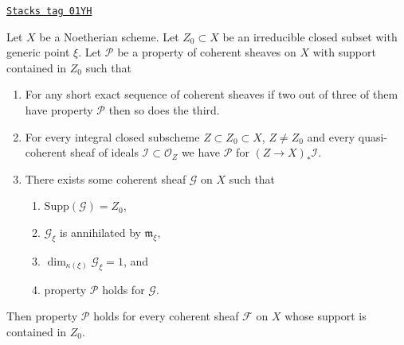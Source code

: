 \begin{lemma}
\label{coherent-lemma-property-irreducible}
\href{https://stacks.math.columbia.edu/tag/01YH}{\texttt{Stacks tag 01YH}}

Let $X$ be a Noetherian scheme. Let $Z_0 \subset X$ be an irreducible closed
subset with generic point $\xi$. Let $\mathcal{P}$ be a property of coherent
sheaves on $X$ with support contained in $Z_0$ such that
\begin{enumerate}
\item For any short exact sequence of coherent sheaves if two
out of three of them have property $\mathcal{P}$ then so does the
third.
\item For every integral closed subscheme $Z \subset Z_0 \subset X$,
$Z \not = Z_0$ and every quasi-coherent sheaf of ideals
$\mathcal{I} \subset \mathcal{O}_Z$ we have
$\mathcal{P}$ for $(Z \to X)_*\mathcal{I}$.
\item There exists some coherent sheaf $\mathcal{G}$ on $X$ such that
\begin{enumerate}
\item $\text{Supp}(\mathcal{G}) = Z_0$,
\item $\mathcal{G}_\xi$ is annihilated by $\mathfrak m_\xi$,
\item $\dim_{\kappa(\xi)} \mathcal{G}_\xi = 1$, and
\item property $\mathcal{P}$ holds for $\mathcal{G}$.
\end{enumerate}
\end{enumerate}
Then property $\mathcal{P}$ holds for every coherent sheaf
$\mathcal{F}$ on $X$ whose support is contained in $Z_0$.
\end{lemma}

